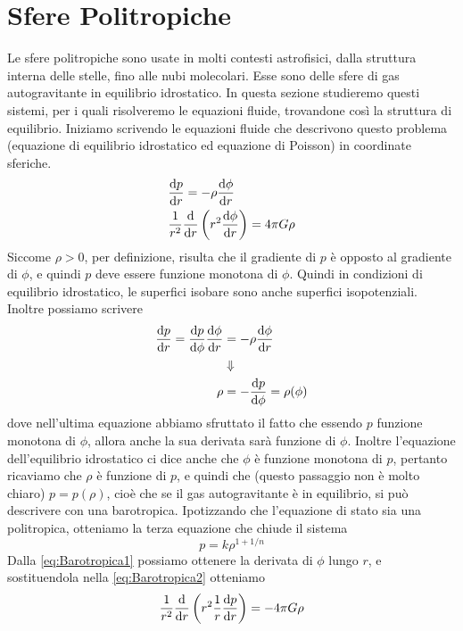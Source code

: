 \section{Sfere Politropiche} \label{sec:SferePolitropiche}
Le sfere politropiche sono usate in molti contesti astrofisici, dalla struttura interna delle stelle, fino alle nubi molecolari. Esse sono delle sfere di gas autogravitante in equilibrio idrostatico. In questa sezione studieremo questi sistemi, per i quali risolveremo le equazioni fluide, trovandone così la struttura di equilibrio. Iniziamo scrivendo le equazioni fluide che descrivono questo problema (equazione di equilibrio idrostatico ed equazione di Poisson) in coordinate sferiche.
\begin{align}
& \dfrac{\mathrm{d} {p}}{\mathrm{d} {r}} = -\rho \dfrac{\mathrm{d} {\phi}}{\mathrm{d} {r}} \label{eq:Barotropica1} \\
& \frac{1}{r^2}\dfrac{\mathrm{d} {}}{\mathrm{d} {r}} \left( r^2 \dfrac{\mathrm{d} {\phi}}{\mathrm{d} {r}} \right) = 4\pi G \rho \label{eq:Barotropica2}
\end{align}
Siccome $\rho>0$, per definizione, risulta che il gradiente di $p$ è opposto al gradiente di $\phi$, e quindi $p$ deve essere funzione monotona di $\phi$. Quindi in condizioni di equilibrio idrostatico, le superfici isobare sono anche superfici isopotenziali. Inoltre possiamo scrivere
\begin{align*}
\dfrac{\mathrm{d} {p}}{\mathrm{d} {r}} = \dfrac{\mathrm{d} {p}}{\mathrm{d} {\phi}} \dfrac{\mathrm{d} {\phi}}{\mathrm{d} {r}} &= -\rho \dfrac{\mathrm{d} {\phi}}{\mathrm{d} {r}} \\
& \Downarrow \\
\rho &= -\dfrac{\mathrm{d} {p}}{\mathrm{d} {\phi}} = \rho(\phi)
\end{align*}
dove nell'ultima equazione abbiamo sfruttato il fatto che essendo $p$ funzione monotona di $\phi$, allora anche la sua derivata sarà funzione di $\phi$. Inoltre l'equazione dell'equilibrio idrostatico ci dice anche che $\phi$ è funzione monotona di $p$, pertanto ricaviamo che $\rho$ è funzione di $p$, e quindi che (questo passaggio non è molto chiaro) $p=p(\rho)$, cioè che se il gas autogravitante è in equilibrio, si può descrivere con una barotropica. Ipotizzando che l'equazione di stato sia una politropica, otteniamo la terza equazione che chiude il sistema
\begin{equation}
p = k\rho^{1+1/n}	\label{eq:Barotropica3}
\end{equation}
Dalla \ref{eq:Barotropica1} possiamo ottenere la derivata di $\phi$ lungo $r$, e sostituendola nella \ref{eq:Barotropica2} otteniamo
\begin{equation}
\frac{1}{r^2}\dfrac{\mathrm{d} {}}{\mathrm{d} {r}} \left( r^2 \frac{1}{r}\dfrac{\mathrm{d} {p}}{\mathrm{d} {r}} \right) =- 4\pi G \rho \label{eq:Barotropica4}
\end{equation}
